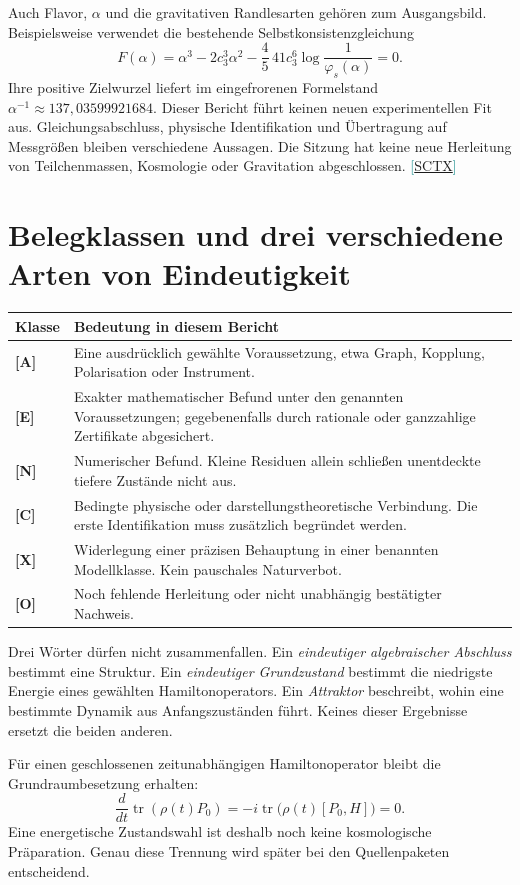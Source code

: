 \documentclass[11pt,a4paper,oneside,parskip=half,headings=normal,numbers=noenddot,bibliography=totoc]{scrreprt}
\newcommand{\tr}{\operatorname{tr}}
\newcommand{\src}[1]{\textcolor{teal}{\small[\hyperref[s:#1]{S#1}]}}
\newcommand{\st}[1]{\textsf{\textbf{[#1]}}}
\begin{document}
Auch Flavor, $\alpha$ und die gravitativen Randlesarten gehören zum Ausgangsbild. Beispielsweise verwendet die bestehende Selbstkonsistenzgleichung
\[
 F(\alpha)=\alpha^3-2c_3^3\alpha^2-\frac45\,41c_3^6
 \log\!\frac1{\varphi_s(\alpha)}=0.
\]
Ihre positive Zielwurzel liefert im eingefrorenen Formelstand $\alpha^{-1}\approx137{,}03599921684$. Dieser Bericht führt keinen neuen experimentellen Fit aus. Gleichungsabschluss, physische Identifikation und Übertragung auf Messgrößen bleiben verschiedene Aussagen. Die Sitzung hat keine neue Herleitung von Teilchenmassen, Kosmologie oder Gravitation abgeschlossen. \src{CTX}

\section{Belegklassen und drei verschiedene Arten von Eindeutigkeit}
\noindent\begin{tabularx}{\textwidth}{@{}lY@{}}
\toprule
Klasse & Bedeutung in diesem Bericht\\\midrule
\st{A} & Eine ausdrücklich gewählte Voraussetzung, etwa Graph, Kopplung, Polarisation oder Instrument.\\
\st{E} & Exakter mathematischer Befund unter den genannten Voraussetzungen; gegebenenfalls durch rationale oder ganzzahlige Zertifikate abgesichert.\\
\st{N} & Numerischer Befund. Kleine Residuen allein schließen unentdeckte tiefere Zustände nicht aus.\\
\st{C} & Bedingte physische oder darstellungstheoretische Verbindung. Die erste Identifikation muss zusätzlich begründet werden.\\
\st{X} & Widerlegung einer präzisen Behauptung in einer benannten Modellklasse. Kein pauschales Naturverbot.\\
\st{O} & Noch fehlende Herleitung oder nicht unabhängig bestätigter Nachweis.\\\bottomrule
\end{tabularx}

Drei Wörter dürfen nicht zusammenfallen. Ein \emph{eindeutiger algebraischer Abschluss} bestimmt eine Struktur. Ein \emph{eindeutiger Grundzustand} bestimmt die niedrigste Energie eines gewählten Hamiltonoperators. Ein \emph{Attraktor} beschreibt, wohin eine bestimmte Dynamik aus Anfangszuständen führt. Keines dieser Ergebnisse ersetzt die beiden anderen.

Für einen geschlossenen zeitunabhängigen Hamiltonoperator bleibt die Grundraumbesetzung erhalten:
\[
 \frac{d}{dt}\tr(\rho(t)P_0)
 =-i\tr\bigl(\rho(t)[P_0,H]\bigr)=0.
\]
Eine energetische Zustandswahl ist deshalb noch keine kosmologische Präparation. Genau diese Trennung wird später bei den Quellenpaketen entscheidend.
\end{document}
